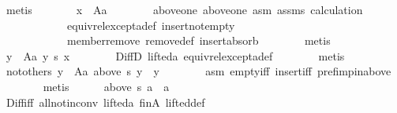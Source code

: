 \begin{isabellebody}
\ metis\isanewline
\ \ \ \ \isamarkupfalse%
\ \isamarkupfalse%
\ {\isachardoublequoteopen}x\ {\isasymin}\ A{\isacharminus}{\kern0pt}{\isacharbraceleft}{\kern0pt}a{\isacharbraceright}{\kern0pt}{\isachardoublequoteclose}\isanewline
\ \ \ \ \ \ \isamarkupfalse%
\ above{\isacharunderscore}{\kern0pt}one\ above{\isacharunderscore}{\kern0pt}one{}\ asm{}\ assms\ calculation\isanewline
\ \ \ \ \ \ \ \ \ \ \ \ equiv{\isacharunderscore}{\kern0pt}rel{\isacharunderscore}{\kern0pt}except{\isacharunderscore}{\kern0pt}a{\isacharunderscore}{\kern0pt}def\ insert{\isacharunderscore}{\kern0pt}not{\isacharunderscore}{\kern0pt}empty\isanewline
\ \ \ \ \ \ \ \ \ \ \ \ member{\isacharunderscore}{\kern0pt}remove\ remove{\isacharunderscore}{\kern0pt}def\ insert{\isacharunderscore}{\kern0pt}absorb\isanewline
\ \ \ \ \ \ \isamarkupfalse%
\ metis\isanewline
\ \ \ \ \isamarkupfalse%
\ \isamarkupfalse%
\ {\isachardoublequoteopen}{\isasymforall}y\ {\isasymin}\ A{\isacharminus}{\kern0pt}{\isacharbraceleft}{\kern0pt}a{\isacharbraceright}{\kern0pt}{\isachardot}{\kern0pt}\ y\ {\isasympreceq}\isactrlsub s\ x{\isachardoublequoteclose}\isanewline
\ \ \ \ \ \ \isamarkupfalse%
\ DiffD{}\ lifted{\isacharunderscore}{\kern0pt}a\ equiv{\isacharunderscore}{\kern0pt}rel{\isacharunderscore}{\kern0pt}except{\isacharunderscore}{\kern0pt}a{\isacharunderscore}{\kern0pt}def\isanewline
\ \ \ \ \ \ \isamarkupfalse%
\ metis\isanewline
\ \ \ \ \isamarkupfalse%
\ not{\isacharunderscore}{\kern0pt}others{\isacharcolon}{\kern0pt}\ {\isachardoublequoteopen}{\isasymforall}y\ {\isasymin}\ A{\isacharminus}{\kern0pt}{\isacharbraceleft}{\kern0pt}a{\isacharbraceright}{\kern0pt}{\isachardot}{\kern0pt}\ above\ s\ y\ {\isasymnoteq}\ {\isacharbraceleft}{\kern0pt}y{\isacharbraceright}{\kern0pt}{\isachardoublequoteclose}\isanewline
\ \ \ \ \ \ \isamarkupfalse%
\ asm{}\ empty{\isacharunderscore}{\kern0pt}iff\ insert{\isacharunderscore}{\kern0pt}iff\ pref{\isacharunderscore}{\kern0pt}imp{\isacharunderscore}{\kern0pt}in{\isacharunderscore}{\kern0pt}above\isanewline
\ \ \ \ \ \ \isamarkupfalse%
\ metis\isanewline
\ \ \ \ \isamarkupfalse%
\ {\isachardoublequoteopen}above\ s\ a\ {\isacharequal}{\kern0pt}\ {\isacharbraceleft}{\kern0pt}a{\isacharbraceright}{\kern0pt}{\isachardoublequoteclose}\isanewline
\ \ \ \ \ \ \isamarkupfalse%
\ Diff{\isacharunderscore}{\kern0pt}iff\ all{\isacharunderscore}{\kern0pt}not{\isacharunderscore}{\kern0pt}in{\isacharunderscore}{\kern0pt}conv\ lifted{\isacharunderscore}{\kern0pt}a\ fin{\isacharunderscore}{\kern0pt}A\ lifted{\isacharunderscore}{\kern0pt}def\isanewline

\end{isabellebody}
